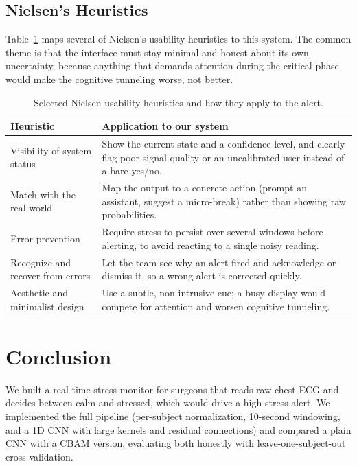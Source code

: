 \documentclass[conference]{IEEEtran}
\begin{document}
\subsection{Nielsen's Heuristics}
Table~\ref{tab:nielsen} maps several of Nielsen's usability heuristics to this
system. The common theme is that the interface must stay minimal and honest about
its own uncertainty, because anything that demands attention during the critical
phase would make the cognitive tunneling worse, not better.

\begin{table}[t]
\caption{Selected Nielsen usability heuristics and how they apply to the alert.}
\label{tab:nielsen}
\centering
\footnotesize
\begin{tabular}{|p{2.4cm}|p{4.9cm}|}
\hline
\textbf{Heuristic} & \textbf{Application to our system} \\
\hline
Visibility of system status & Show the current state and a confidence level, and clearly flag poor signal quality or an uncalibrated user instead of a bare yes/no. \\
\hline
Match with the real world & Map the output to a concrete action (prompt an assistant, suggest a micro-break) rather than showing raw probabilities. \\
\hline
Error prevention & Require stress to persist over several windows before alerting, to avoid reacting to a single noisy reading. \\
\hline
Recognize and recover from errors & Let the team see why an alert fired and acknowledge or dismiss it, so a wrong alert is corrected quickly. \\
\hline
Aesthetic and minimalist design & Use a subtle, non-intrusive cue; a busy display would compete for attention and worsen cognitive tunneling. \\
\hline
\end{tabular}
\end{table}

\section{Conclusion}
We built a real-time stress monitor for surgeons that reads raw chest ECG and
decides between calm and stressed, which would drive a high-stress alert. We
implemented the full pipeline (per-subject normalization, 10-second windowing,
and a 1D CNN with large kernels and residual connections) and compared a plain
CNN with a CBAM version, evaluating both honestly with leave-one-subject-out
cross-validation.
\end{document}
